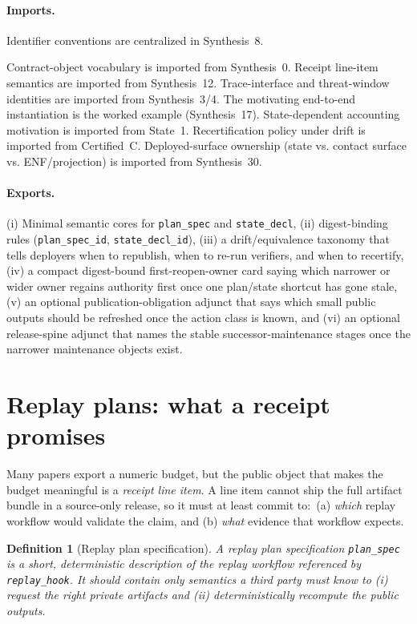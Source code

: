 \documentclass[11pt]{article}
\newtheorem{definition}{Definition}
\begin{document}
\paragraph{Imports.}
Identifier conventions are centralized in Synthesis~8.\cite{series:notation}

Contract-object vocabulary is imported from Synthesis~0.\cite{series:contractobjects}
Receipt line-item semantics are imported from Synthesis~12.\cite{series:receiptitems}
Trace-interface and threat-window identities are imported from Synthesis~3/4.\cite{series:traceifaces,series:threatwindows}
The motivating end-to-end instantiation is the worked example (Synthesis~17).\cite{series:workedexample}
State-dependent accounting motivation is imported from State~1.\cite{series:state1}
Recertification policy under drift is imported from Certified~C.\cite{series:recert}
Deployed-surface ownership (state vs. contact surface vs. ENF/projection) is imported from Synthesis~30.\cite{series:deployedsurfaces}

\paragraph{Exports.}
(i) Minimal semantic cores for \texttt{plan\_spec} and \texttt{state\_decl},
(ii) digest-binding rules (\texttt{plan\_spec\_id}, \texttt{state\_decl\_id}),
(iii) a drift/equivalence taxonomy that tells deployers when to republish, when to re-run verifiers, and when to recertify,
(iv) a compact digest-bound first-reopen-owner card saying which narrower or wider owner regains authority first once one plan/state shortcut has gone stale,
(v) an optional publication-obligation adjunct that says which small public outputs should be refreshed once the action class is known, and
(vi) an optional release-spine adjunct that names the stable successor-maintenance stages once the narrower maintenance objects exist.

\section{Replay plans: what a receipt promises}
Many papers export a numeric budget, but the public object that makes the budget meaningful is a \emph{receipt line item}.\cite{series:receiptitems}
A line item cannot ship the full artifact bundle in a source-only release, so it must at least commit to:\
(a) \emph{which} replay workflow would validate the claim, and
(b) \emph{what} evidence that workflow expects.

\begin{definition}[Replay plan specification]
A \emph{replay plan specification} \texttt{plan\_spec} is a short, deterministic description of the replay workflow referenced by \texttt{replay\_hook}.
It should contain only semantics a third party must know to (i) request the right private artifacts and (ii) deterministically recompute the public outputs.
\end{definition}
\end{document}
